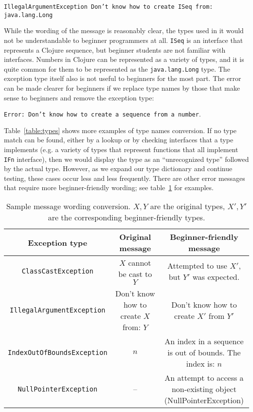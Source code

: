 \documentclass[submission,copyright,creativecommons]{eptcs}
\begin{document}
{\tt IllegalArgumentException Don't know how to create ISeq from: java.lang.Long}

While the wording of the message is reasonably clear, the types used in it would not be understandable to beginner programmers at all. {\tt ISeq} is an interface that represents a Clojure sequence, but beginner students are not familiar with interfaces. Numbers in Clojure can be represented as a variety of types, and it is quite common for them to be represented as the {\tt  java.lang.Long} type. The exception type itself also is not useful to beginners for the most part. 
The error can be made clearer for beginners if we replace type names by those that make sense to beginners and remove the exception type:

{\tt Error: Don't know how to create a sequence from a number}. 

Table~\ref{table:types} shows more examples of type names conversion. If no type match can be found, either by a lookup or by checking interfaces that a type implements (e.g. a variety of types that represent functions that all implement {\tt IFn} interface), then we would display the type as an ``unrecognized type'' followed by the actual type. However, as we expand our type dictionary and continue testing, these cases occur less and less frequently. 
There are other error messages that require more beginner-friendly wording; see table~\ref{table:messages} for examples. 

 \begin{table}[b]
\begin{tabular}{|c|c|c|}
\hline
Exception type & Original message & Beginner-friendly message \\
\hline 
{\tt ClassCastException} & $X$ cannot be cast to $Y$ & {\parbox{5cm}{Attempted to use $X'$, \\ 
but $Y'$ was expected.}} \\[0.3cm]
\hline
{\tt IllegalArgumentException} & 
Don't know how to create $X$ from:  $Y$ & 
{\parbox{5cm}{Don't know how to \\ create  $X'$ from $Y'$}} \\[0.3cm]
\hline
{\tt IndexOutOfBoundsException} & $n$ & {\parbox{5cm}{An index in a sequence \\ 
is out of bounds. The index is: $n$}} \\[0.3cm]
\hline
{\tt NullPointerException} & -- &  {\parbox{5cm}{An attempt to access a 
\\ non-existing object
\\ (NullPointerException)}} \\[0.3cm]
\hline
\end{tabular}
\caption{Sample message wording conversion. $X,Y$ are the original types, $X',Y'$ are the corresponding beginner-friendly types. }\label{table:messages}
\end{table}
\end{document}
